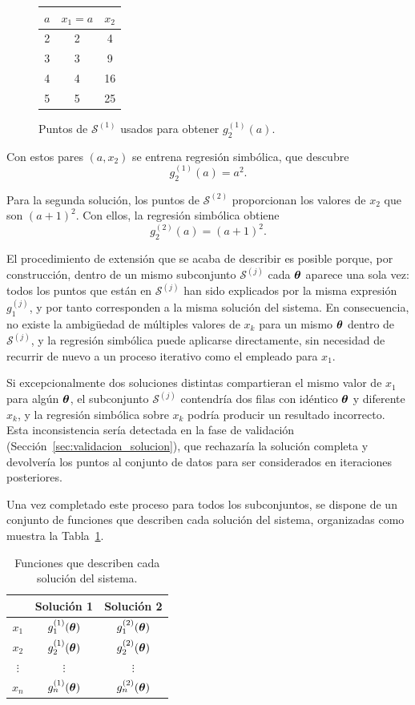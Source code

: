\documentclass{article} \usepackage[utf8]{inputenc} \usepackage[spanish]{babel} \spanishdecimal{.} \usepackage{amsmath, amssymb, amsthm} \usepackage{bm} \usepackage{float} \usepackage{longtable} \usepackage[hidelinks]{hyperref}
\begin{document}
\begin{figure}[H]
\centering
\begin{tabular}{c|c|c}
\(a\) & \(x_1 = a\) & \(x_2\) \\
\hline
2 & 2 & 4 \\
3 & 3 & 9 \\
4 & 4 & 16 \\
5 & 5 & 25
\end{tabular}
\caption{Puntos de \(\mathcal{S}^{(1)}\) usados para obtener
\(g_2^{(1)}(a)\).}
\label{fig:extension_tabla}
\end{figure}

Con estos pares \((a, x_2)\) se entrena regresión simbólica, que
descubre
\[
g_2^{(1)}(a) = a^2 .
\]

Para la segunda solución, los puntos de \(\mathcal{S}^{(2)}\)
proporcionan los valores de \(x_2\) que son \((a+1)^2\). Con ellos, la
regresión simbólica obtiene
\[
g_2^{(2)}(a) = (a+1)^2 .
\]

El procedimiento de extensión que se acaba de describir es posible
porque, por construcción, dentro de un mismo subconjunto
\(\mathcal{S}^{(j)}\) cada \(\boldsymbol{\theta}\) aparece una sola vez: todos
los puntos que están en \(\mathcal{S}^{(j)}\) han sido explicados por
la misma expresión \(g_1^{(j)}\), y por tanto corresponden a la misma
solución del sistema. En consecuencia, no existe la ambigüedad de
múltiples valores de \(x_k\) para un mismo \(\boldsymbol{\theta}\) dentro de
\(\mathcal{S}^{(j)}\), y la regresión simbólica puede aplicarse
directamente, sin necesidad de recurrir de nuevo a un proceso
iterativo como el empleado para \(x_1\).

Si excepcionalmente dos soluciones distintas compartieran el mismo
valor de \(x_1\) para algún \(\boldsymbol{\theta}\), el subconjunto
\(\mathcal{S}^{(j)}\) contendría dos filas con idéntico \(\boldsymbol{\theta}\)
y diferente \(x_k\), y la regresión simbólica sobre \(x_k\) podría
producir un resultado incorrecto. Esta inconsistencia sería detectada
en la fase de validación
(Sección~\ref{sec:validacion_solucion}), que rechazaría la solución
completa y devolvería los puntos al conjunto de datos para ser
considerados en iteraciones posteriores.

Una vez completado este proceso para todos los subconjuntos, se
dispone de un conjunto de funciones que describen cada solución del
sistema, organizadas como muestra la
Tabla~\ref{tab:tabla_funciones_solucion}.

\begin{table}[H]
\centering
\caption{Funciones que describen cada solución del sistema.}
\label{tab:tabla_funciones_solucion}
\begin{tabular}{c|cc}
 & Solución 1 & Solución 2 \\
\hline
\(x_1\) & \(g_1^{(1)}(\boldsymbol{\theta})\) & \(g_1^{(2)}(\boldsymbol{\theta})\) \\
\(x_2\) & \(g_2^{(1)}(\boldsymbol{\theta})\) & \(g_2^{(2)}(\boldsymbol{\theta})\) \\
\(\vdots\) & \(\vdots\) & \(\vdots\) \\
\(x_n\) & \(g_n^{(1)}(\boldsymbol{\theta})\) & \(g_n^{(2)}(\boldsymbol{\theta})\)
\end{tabular}
\end{table}
\end{document}
